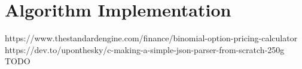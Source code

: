 \section{Algorithm Implementation}

https://www.thestandardengine.com/finance/binomial-option-pricing-calculator
https://dev.to/uponthesky/c-making-a-simple-json-parser-from-scratch-250g
TODO